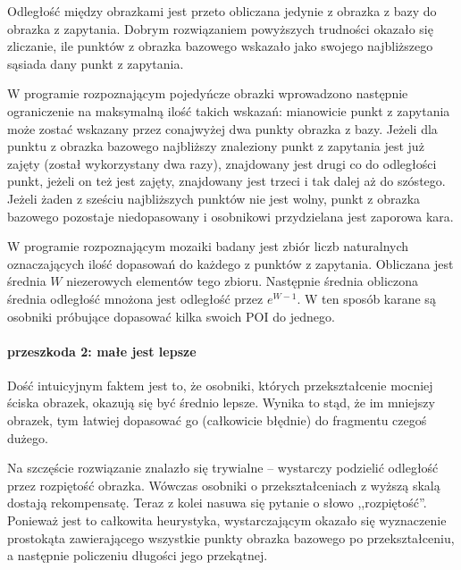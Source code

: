 \documentclass[a4paper,12pt,leqno]{article}
\begin{document}
Odległość między obrazkami jest przeto obliczana jedynie z obrazka z bazy do obrazka z zapytania. Dobrym rozwiązaniem powyższych trudności okazało się zliczanie,
ile punktów z obrazka bazowego wskazało jako swojego najbliższego sąsiada dany punkt z zapytania.

W programie rozpoznającym pojedyńcze obrazki wprowadzono następnie ograniczenie na maksymalną ilość takich wskazań: mianowicie punkt z zapytania może zostać
wskazany przez conajwyżej dwa punkty obrazka z bazy. Jeżeli dla punktu z obrazka bazowego najbliższy znaleziony punkt z zapytania jest już zajęty (został
wykorzystany dwa razy), znajdowany jest drugi co do odległości punkt, jeżeli on też jest zajęty, znajdowany jest trzeci i tak dalej aż do szóstego. Jeżeli
żaden z sześciu najbliższych punktów nie jest wolny, punkt z obrazka bazowego pozostaje niedopasowany i osobnikowi przydzielana jest zaporowa kara.

W programie rozpoznającym mozaiki badany jest zbiór liczb naturalnych oznaczających ilość dopasowań do każdego z punktów z zapytania. Obliczana jest średnia
$W$ niezerowych elementów tego zbioru. Następnie średnia obliczona średnia odległość mnożona jest odległość przez $e^{W-1}$. W ten sposób karane są
osobniki próbujące dopasować kilka swoich POI do jednego.

\paragraph{przeszkoda 2: małe jest lepsze}
Dość intuicyjnym faktem jest to, że osobniki, których przekształcenie mocniej ściska obrazek, okazują się być średnio lepsze. Wynika to stąd, że im mniejszy obrazek, 
tym łatwiej dopasować go (całkowicie błędnie) do fragmentu czegoś dużego. 

Na szczęście rozwiązanie znalazło się trywialne -- wystarczy podzielić odległość przez rozpiętość obrazka. Wówczas osobniki o przekształceniach z wyższą skalą dostają rekompensatę.
Teraz z kolei nasuwa się pytanie o słowo ,,rozpiętość''. Ponieważ jest to całkowita heurystyka, wystarczającym okazało się wyznaczenie prostokąta zawierającego wszystkie punkty 
obrazka bazowego po przekształceniu, a następnie policzeniu długości jego przekątnej.
\end{document}
